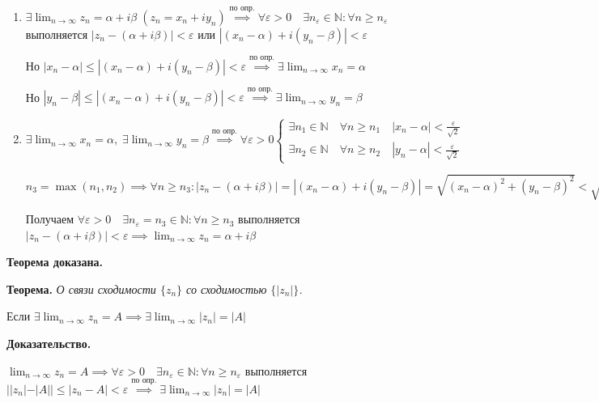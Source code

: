 \documentclass{article}
\newcommand{\bydef}{\stackrel{\text{по опр.}}{\implies}} %
\newcommand{\parspace}{\vspace{10pt}}
\newcommand{\dslim}{\displaystyle\lim}
\newcommand{\dslimn}{\dslim_{n \to \infty}}
\theoremstyle{break}
\begin{document}
\begin{enumerate}
    \item %
    $\exists \dslimn z_n = \alpha + i \beta \; (z_n = x_n + i y_n)
    \bydef \forall \varepsilon > 0 \quad \exists n_\varepsilon \in \mathbb{N}:
    \forall n \ge n_\varepsilon$ выполняется $|z_n - (\alpha + i \beta)| < \varepsilon$
    или $|(x_n- \alpha) + i (y_n - \beta)| < \varepsilon$

    Но $|x_n - \alpha| \le |(x_n - \alpha) + i (y_n - \beta)| < \varepsilon
    \bydef \exists \dslimn x_n = \alpha$

    Но $|y_n - \beta| \le |(x_n - \alpha) + i (y_n - \beta)| < \varepsilon
    \bydef \exists \dslimn y_n = \beta$

    \item %
    $\exists \dslimn x_n = \alpha, \; \exists \dslimn y_n = \beta
    \bydef \forall \varepsilon > 0 \begin{cases}
        \exists n_1 \in \mathbb{N} \quad \forall n \ge n_1 \quad |x_n - \alpha| < \frac{\varepsilon}{\sqrt{2}} \\
        \exists n_2 \in \mathbb{N} \quad \forall n \ge n_2 \quad |y_n - \alpha| < \frac{\varepsilon}{\sqrt{2}}
    \end{cases}$
    
    $n_3 = \max (n_1, n_2) \implies \forall n \ge n_3:
    |z_n - (\alpha + i \beta)| = |(x_n - \alpha) + i (y_n - \beta)| =
    \sqrt{(x_n - \alpha)^2 + (y_n - \beta)^2} <
    \sqrt{\frac{\varepsilon^2}{2} + \frac{\varepsilon^2}{2}} = \varepsilon$

    Получаем $\forall \varepsilon > 0 \quad \exists n_\varepsilon = n_3 \in \mathbb{N}:
    \forall n \ge n_3$ выполняется $|z_n - (\alpha + i \beta)| < \varepsilon
    \implies \dslimn z_n = \alpha + i \beta$
\end{enumerate}

\textbf{Теорема доказана.}

\parspace

\textbf{Теорема.} \textit{О связи сходимости $\{z_n\}$ со сходимостью $\{|z_n|\}$.}

Если $\exists \dslimn z_n = A \implies \exists \dslimn |z_n| = |A|$

\textbf{Доказательство.}

$\dslimn z_n = A \implies \forall \varepsilon > 0 \quad \exists n_\varepsilon \in \mathbb{N}:
\forall n \ge n_\varepsilon$ выполняется $||z_n| - |A|| \le |z_n - A| < \varepsilon
\bydef \exists \dslimn |z_n| = |A|$
\end{document}
